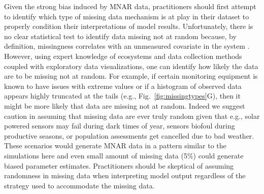 \documentclass{article}
\begin{document}
Given the strong bias induced by MNAR data, practitioners should first attempt to identify which type of missing data mechanism is at play in their dataset to properly condition their interpretations of model results. Unfortunately, there is no clear statistical test to identify data missing not at random because, by definition, missingness correlates with an unmeasured covariate in the system \citep{van2018flexible}. However, using expert knowledge of ecosystems and data collection methods coupled  with  exploratory data visualizations, one can identify how likely the data are to be missing not at random. For example, if certain monitoring equipment is known to have issues with extreme values or if a histogram of observed data appears highly truncated at the tails (e.g., Fig.\ \ref{fig:missingtypes}G), then it might be more likely that data are missing not at random.  Indeed we suggest caution in assuming that missing data are ever truly random given that e.g., solar powered sensors may fail during dark times of year, sensors biofoul during productive seasons, or population assessments get cancelled due to bad weather.   These scenarios would generate MNAR data in a pattern similar to the simulations here and even small amount of missing data (5\%) could generate biased parameter estimates.  Practitioners should be skeptical of assuming randomness in missing data when interpreting model output regardless of the strategy used to accommodate the missing data.


\end{document}
